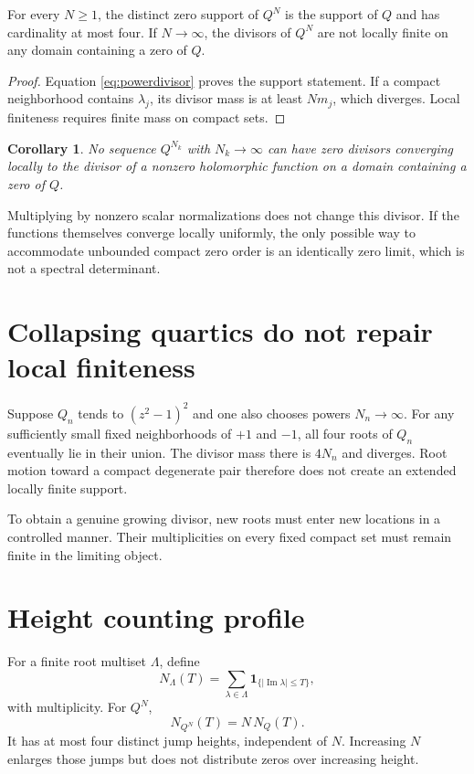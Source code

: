\documentclass[12pt]{article}
\newtheorem{corollary}[theorem]{Corollary}
\theoremstyle{remark}\newtheorem{remark}[theorem]{Remark}
\begin{document}
\begin{proposition}\label{prop:support}
For every $N\ge1$, the distinct zero support of $Q^N$ is the support of $Q$
and has cardinality at most four.  If $N\to\infty$, the divisors of $Q^N$ are
not locally finite on any domain containing a zero of $Q$.
\end{proposition}
\begin{proof}
Equation \eqref{eq:powerdivisor} proves the support statement.  If a compact
neighborhood contains $\lambda_j$, its divisor mass is at least $Nm_j$, which
diverges.  Local finiteness requires finite mass on compact sets.
\end{proof}

\begin{corollary}\label{cor:holomorphic}
No sequence $Q^{N_k}$ with $N_k\to\infty$ can have zero divisors converging
locally to the divisor of a nonzero holomorphic function on a domain
containing a zero of $Q$.
\end{corollary}

Multiplying by nonzero scalar normalizations does not change this divisor.
If the functions themselves converge locally uniformly, the only possible
way to accommodate unbounded compact zero order is an identically zero
limit, which is not a spectral determinant.

\section{Collapsing quartics do not repair local finiteness}

Suppose $Q_n$ tends to $(z^2-1)^2$ and one also chooses powers $N_n\to\infty$.
For any sufficiently small fixed neighborhoods of $+1$ and $-1$, all four
roots of $Q_n$ eventually lie in their union.  The divisor mass there is
$4N_n$ and diverges.  Root motion toward a compact degenerate pair therefore
does not create an extended locally finite support.

To obtain a genuine growing divisor, new roots must enter new locations in a
controlled manner.  Their multiplicities on every fixed compact set must
remain finite in the limiting object.

\section{Height counting profile}

For a finite root multiset $\Lambda$, define
\begin{equation}\label{eq:count}
 N_\Lambda(T)=\sum_{\lambda\in\Lambda}
 \mathbf 1_{\{|\operatorname{Im}\lambda|\le T\}},
\end{equation}
with multiplicity.  For $Q^N$,
\begin{equation}
 N_{Q^N}(T)=N\,N_Q(T).
\end{equation}
It has at most four distinct jump heights, independent of $N$.  Increasing
$N$ enlarges those jumps but does not distribute zeros over increasing
height.
\end{document}
